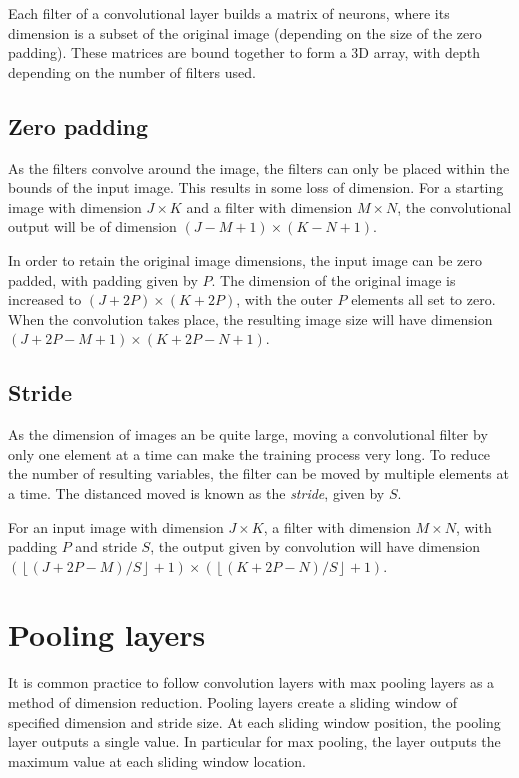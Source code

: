Each filter of a convolutional layer builds a matrix of neurons, where its dimension is a subset of the original image (depending on the size of the zero padding). These matrices are bound together to form a 3D array, with depth depending on the number of filters used.

\subsection*{Zero padding}\label{convnets-pad}

As the filters convolve around the image, the filters can only be placed within the bounds of the input image. This results in some loss of dimension. For a starting image with dimension $J \times K$ and a filter with dimension $M \times N$, the convolutional output will be of dimension $(J - M + 1)\times (K - N + 1)$.

In order to retain the original image dimensions, the input image can be zero padded, with padding given by $P$. The dimension of the original image is increased to $(J+2P) \times (K+2P)$, with the outer $P$ elements all set to zero. When the convolution takes place, the resulting image size will have dimension $(J+2P - M + 1) \times (K + 2P - N + 1)$.

\subsection*{Stride}\label{convnets-stride}

As the dimension of images an be quite large, moving a convolutional filter by only one element at a time can make the training process very long. To reduce the number of resulting variables, the filter can be moved by multiple elements at a time. The distanced moved is known as the \textit{stride}, given by $S$.

For an input image with dimension $J \times K$, a filter with dimension $M \times N$, with padding $P$ and stride $S$, the output given by convolution will have dimension $\left(\left\lfloor (J + 2P - M)/S\right\rfloor + 1\right) \times \left(\left\lfloor (K + 2P - N)/S \right\rfloor + 1\right)$.

\section{Pooling layers}\label{convnets-pool}

It is common practice to follow convolution layers with max pooling layers as a method of dimension reduction\cite{ADeshpande2016}. Pooling layers create a sliding window of specified dimension and stride size. At each sliding window position, the pooling layer outputs a single value. In particular for max pooling, the layer outputs the maximum value at each sliding window location.

